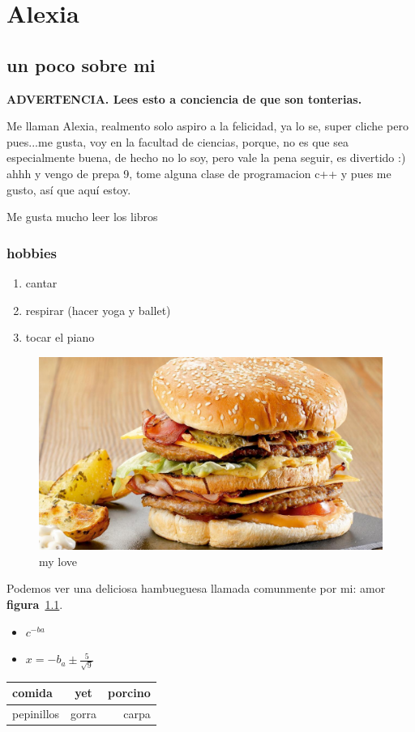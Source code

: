 

\chapter{Alexia}

\section{un poco sobre mi}
\textbf{ADVERTENCIA. Lees esto a conciencia de que son tonterias.}

Me llaman Alexia, realmento solo aspiro a la felicidad, ya lo se, super cliche pero pues...me gusta, voy en la facultad de ciencias, porque, no es que sea especialmente buena, de hecho no lo soy, pero vale la pena seguir, es divertido :) ahhh y vengo de prepa 9, tome alguna clase de programacion c++ y pues me gusto, así que aquí estoy. 


Me gusta mucho leer los libros~\cite{torres,comunidad,retorno}

\subsection{hobbies}

\begin{enumerate}
\item cantar
\item respirar (hacer yoga y ballet)
\item tocar el piano
\end{enumerate}

\begin{figure}[h]
  \centering
  \includegraphics[scale=0.10]{IMG/6.jpg}
  \caption{my love}
  \label{fig:hamburguesa}
\end {figure}

Podemos ver una deliciosa hambueguesa llamada comunmente por mi: amor
\textbf{figura}~\ref{fig:hamburguesa}.

\begin{itemize}
\item $c^{-ba}$
\item $x=-b_a \pm \frac{5}{\sqrt{9}}$
 \end{itemize}

\begin{tabular}{|l | c | r|}
  \hline
  comida & yet & porcino \\
  \hline
  pepinillos & gorra & carpa \\
  \hline
  
\end{tabular}

